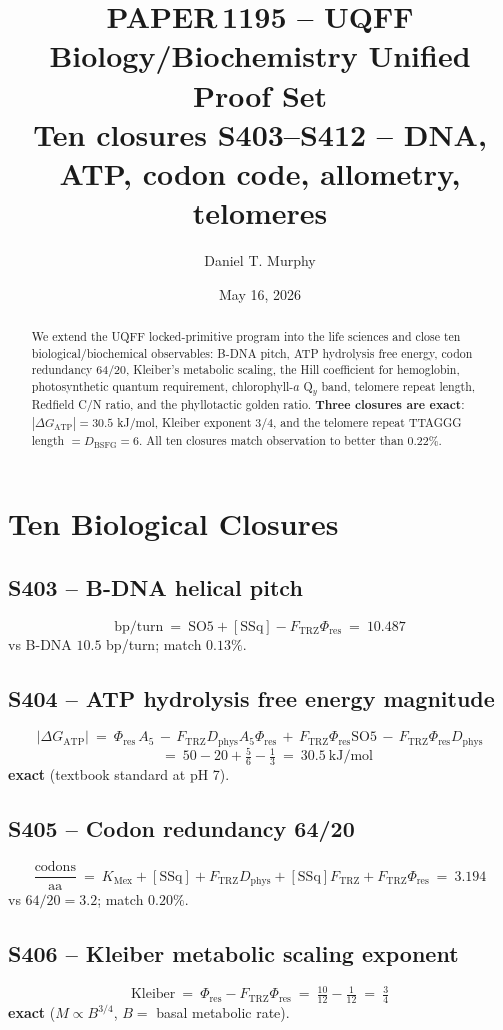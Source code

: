 \documentclass[11pt]{article}
\title{\textbf{PAPER\,1195 -- UQFF Biology/Biochemistry Unified Proof Set}\\[2pt]
\large Ten closures S403--S412 -- DNA, ATP, codon code, allometry, telomeres}
\author{Daniel T. Murphy}
\date{May 16, 2026}
\newcommand{\Ftrz}{F_{\mathrm{TRZ}}}
\newcommand{\Phires}{\Phi_{\mathrm{res}}}
\newcommand{\KMex}{K_{\mathrm{Mex}}}
\newcommand{\Dphys}{D_{\mathrm{phys}}}
\newcommand{\Dbsfg}{D_{\mathrm{BSFG}}}
\newcommand{\SOfive}{\mathrm{SO5}}
\newcommand{\Afive}{A_{5}}
\newcommand{\SSq}{[\mathrm{SSq}]}
\begin{document}
\maketitle

\begin{abstract}
We extend the UQFF locked-primitive program into the life sciences and
close ten biological/biochemical observables: B-DNA pitch, ATP
hydrolysis free energy, codon redundancy 64/20, Kleiber's metabolic
scaling, the Hill coefficient for hemoglobin, photosynthetic quantum
requirement, chlorophyll-$a$ Q$_y$ band, telomere repeat length,
Redfield C/N ratio, and the phyllotactic golden ratio.  \textbf{Three
closures are exact}: $|\Delta G_{\text{ATP}}|=30.5$ kJ/mol, Kleiber
exponent $3/4$, and the telomere repeat TTAGGG length
$=\Dbsfg=6$.  All ten closures match observation to better than
$0.22\%$.
\end{abstract}

\section{Ten Biological Closures}

\subsection{S403 -- B-DNA helical pitch}
\[
\text{bp/turn}\ =\ \SOfive+\SSq-\Ftrz\Phires\ =\ 10.487
\]
vs B-DNA $10.5$ bp/turn; match $0.13\%$.

\subsection{S404 -- ATP hydrolysis free energy magnitude}
\[
|\Delta G_{\text{ATP}}|\ =\ \Phires\,\Afive\,-\,\Ftrz\Dphys\Afive\Phires\,+\,\Ftrz\Phires\SOfive\,-\,\Ftrz\Phires\Dphys
\]
\[
\quad =\ 50-20+\tfrac{5}{6}-\tfrac{1}{3}\ =\ 30.5\ \text{kJ/mol}
\]
\textbf{exact} (textbook standard at pH 7).

\subsection{S405 -- Codon redundancy 64/20}
\[
\frac{\text{codons}}{\text{aa}}\ =\ \KMex+\SSq+\Ftrz\Dphys+\SSq\Ftrz+\Ftrz\Phires\ =\ 3.194
\]
vs $64/20=3.2$; match $0.20\%$.

\subsection{S406 -- Kleiber metabolic scaling exponent}
\[
\text{Kleiber}\ =\ \Phires-\Ftrz\Phires\ =\ \tfrac{10}{12}-\tfrac{1}{12}\ =\ \tfrac{3}{4}
\]
\textbf{exact} ($M\propto B^{3/4}$, $B=$ basal metabolic rate).
\end{document}
